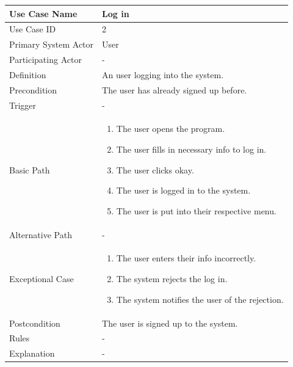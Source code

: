 \documentclass[a4paper,12pt]{report}
\begin{document}
		\begin{tabular}{|m{4cm}|m{11.5cm}|}
			\hline
				Use Case Name & Log in\\
			\hline
				Use Case ID & 2\\
			\hline
				Primary System Actor & User\\
			\hline
				Participating Actor & -\\
			\hline
				Definition & An user logging into the system.\\
			\hline
				Precondition & The user has already signed up before.\\
			\hline
				Trigger & -\\
			\hline
				Basic Path & \begin{enumerate}
					\item The user opens the program.
					\item The user fills in necessary info to log in.
					\item The user clicks okay.
					\item The user is logged in to the system.
					\item The user is put into their respective menu.
				\end{enumerate}		
				\\
			\hline
				Alternative Path & -\\
			\hline
				Exceptional Case & \begin{enumerate}
					\item The user enters their info incorrectly.
					\item The system rejects the log in.
					\item The system notifies the user of the rejection.
				\end{enumerate}
				\\
			\hline
				Postcondition & The user is signed up to the system.\\
			\hline
				Rules & -\\
			\hline
				Explanation & -\\
			\hline
		\end{tabular}
\end{document}

